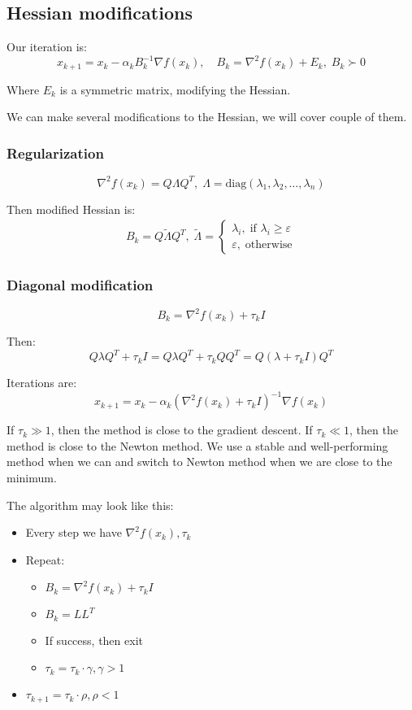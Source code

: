 \subsection{Hessian modifications}

Our iteration is: 
\[
    x_{k+1} = x_k - \alpha_k B^{-1}_k \nabla f(x_k), \quad B_k = \nabla^2 f(x_k) + E_k, \; B_k \succ 0
\]

Where $E_k$ is a symmetric matrix, modifying the Hessian.

We can make several modifications to the Hessian, we will cover couple of them. 

\subsubsection{Regularization}

\[ 
    \nabla^2 f(x_k) = Q \Lambda Q^T, \; \Lambda = \text{diag}(\lambda_1, \lambda_2, \dots, \lambda_n)
\] 

Then modified Hessian is:
\begin{gather*}
    B_k = Q \tilde{\Lambda} Q^T, \; \tilde{\Lambda} = \begin{cases}
        \lambda_i, \; \text{if } \lambda_i \geqslant \varepsilon \\
        \varepsilon, \; \text{otherwise}
    \end{cases}
\end{gather*}

\subsubsection{Diagonal modification}

\[
    B_k = \nabla^2 f(x_k) + \tau_k I 
\]

Then: 
\[ 
    Q \lambda Q^T + \tau_k I = Q \lambda Q^T + \tau_k Q Q^T = Q (\lambda + \tau_k I) Q^T
\]

Iterations are:
\[
    x_{k+1} = x_k - \alpha_k (\nabla^2 f(x_k) + \tau_k I)^{-1} \nabla f(x_k)
\]

If $\tau_k \gg 1$, then the method is close to the gradient descent. If $\tau_k \ll 1$, then the method is close to the Newton method. We use a stable and well-performing method when we can and switch to Newton method when we are close to the minimum.

The algorithm may look like this:
\begin{itemize}
    \item Every step we have $\nabla^2 f(x_k), \tau_k$
    \item Repeat: 
    \begin{itemize}
        \item $B_k = \nabla^2 f(x_k) + \tau_k I$
        \item $B_k = L L^T$
        \item If success, then exit 
        \item $\tau_k = \tau_k \cdot \gamma, \gamma > 1$
    \end{itemize}
    \item $\tau_{k+1} = \tau_k \cdot \rho, \rho < 1$
\end{itemize}

